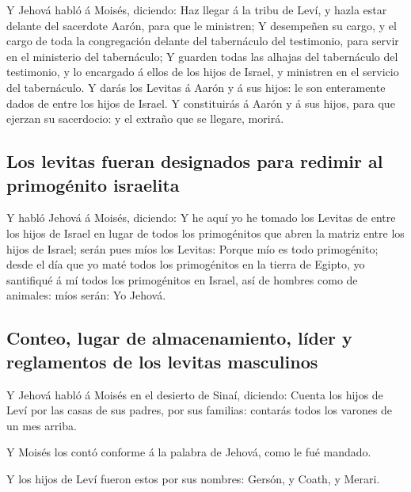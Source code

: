  Y Jehová habló á Moisés, diciendo:  Haz
llegar á la tribu de Leví, y hazla estar delante del sacerdote Aarón,
para que le ministren;  Y desempeñen su cargo, y el cargo
de toda la congregación delante del tabernáculo del testimonio, para
servir en el ministerio del tabernáculo;  Y guarden todas
las alhajas del tabernáculo del testimonio, y lo encargado á ellos de
los hijos de Israel, y ministren en el servicio del tabernáculo.
 Y darás los Levitas á Aarón y á sus hijos: le son
enteramente dados de entre los hijos de Israel.  Y
constituirás á Aarón y á sus hijos, para que ejerzan su sacerdocio: y el
extraño que se llegare, morirá.

\hypertarget{los-levitas-fueran-designados-para-redimir-al-primoguxe9nito-israelita}{%
\subsection{Los levitas fueran designados para redimir al primogénito
israelita}\label{los-levitas-fueran-designados-para-redimir-al-primoguxe9nito-israelita}}

 Y habló Jehová á Moisés, diciendo:  Y he
aquí yo he tomado los Levitas de entre los hijos de Israel en lugar de
todos los primogénitos que abren la matriz entre los hijos de Israel;
serán pues míos los Levitas:  Porque mío es todo
primogénito; desde el día que yo maté todos los primogénitos en la
tierra de Egipto, yo santifiqué á mí todos los primogénitos en Israel,
así de hombres como de animales: míos serán: Yo Jehová.

\hypertarget{conteo-lugar-de-almacenamiento-luxedder-y-reglamentos-de-los-levitas-masculinos}{%
\subsection{Conteo, lugar de almacenamiento, líder y reglamentos de los
levitas
masculinos}\label{conteo-lugar-de-almacenamiento-luxedder-y-reglamentos-de-los-levitas-masculinos}}

 Y Jehová habló á Moisés en el desierto de Sinaí,
diciendo:  Cuenta los hijos de Leví por las casas de sus
padres, por sus familias: contarás todos los varones de un mes arriba.

 Y Moisés los contó conforme á la palabra de Jehová, como
le fué mandado.

 Y los hijos de Leví fueron estos por sus nombres:
Gersón, y Coath, y Merari.

